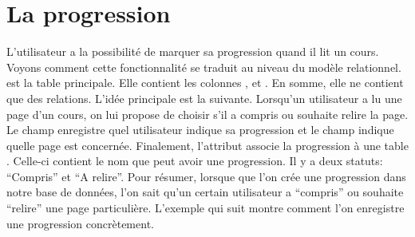 \documentclass[letterpaper,10pt,oneside]{sphinxmanual}
\begin{document}
\section{La progression}
\label{models:la-progression}
L'utilisateur a la possibilité de marquer sa progression quand il lit un cours. Voyons comment cette fonctionnalité se traduit au niveau du modèle relationnel.  est la table principale. Elle contient les colonnes ,  et . En somme, elle ne contient que des relations. L'idée principale est la suivante. Lorsqu'un utilisateur a lu une page d'un cours, on lui propose de choisir s'il a compris ou souhaite relire la page. Le champ  enregistre quel utilisateur indique sa progression et le champ  indique quelle page est concernée. Finalement, l'attribut  associe la progression à une table . Celle-ci contient le nom que peut avoir une progression. Il y a deux statuts: ``Compris'' et ``A relire''. Pour résumer, lorsque que l'on crée une progression dans notre base de données, l'on sait qu'un certain utilisateur a ``compris'' ou souhaite ``relire'' une page particulière. L'exemple qui suit montre comment l'on enregistre une progression concrètement.
\end{document}
